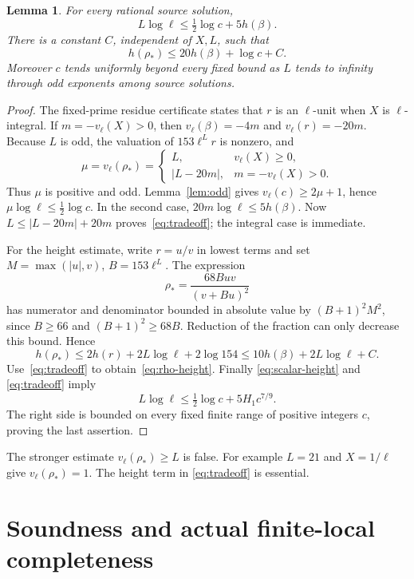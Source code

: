 \documentclass[11pt,a4paper]{article}
\newtheorem{lemma}[theorem]{Lemma}
\begin{document}
\begin{lemma}\label{lem:tradeoff}
For every rational source solution,
\begin{equation}\label{eq:tradeoff}
             L\log\ell\le\tfrac12\log c+5h(\beta).
\end{equation}
There is a constant $C$, independent of $X,L$, such that
\begin{equation}\label{eq:rho-height}
                 h(\rho_*)\le20h(\beta)+\log c+C.
\end{equation}
Moreover $c$ tends uniformly beyond every fixed bound as $L$ tends to
infinity through odd exponents among source solutions.
\end{lemma}
\begin{proof}
The fixed-prime residue certificate states that $r$ is an $\ell$-unit
when $X$ is $\ell$-integral. If $m=-v_\ell(X)>0$, then
$v_\ell(\beta)=-4m$ and $v_\ell(r)=-20m$. Because $L$ is odd,
the valuation of $153\ell^Lr$ is nonzero, and
\[
 \mu=v_\ell(\rho_*)=
 \begin{cases}
 L,&v_\ell(X)\ge0,\\
 |L-20m|,&m=-v_\ell(X)>0.
 \end{cases}
\]
Thus $\mu$ is positive and odd. Lemma~\ref{lem:odd} gives
$v_\ell(c)\ge2\mu+1$, hence $\mu\log\ell\le\frac12\log c$.
In the second case, $20m\log\ell\le5h(\beta)$. Now
$L\le|L-20m|+20m$ proves~\eqref{eq:tradeoff}; the integral case
is immediate.

For the height estimate, write $r=u/v$ in lowest terms and set
$M=\max(|u|,v)$, $B=153\ell^L$. The expression
\[
                 \rho_*=\frac{68Buv}{(v+Bu)^2}
\]
has numerator and denominator bounded in absolute value by
$(B+1)^2M^2$, since $B\ge66$ and $(B+1)^2\ge68B$.
Reduction of the fraction can only decrease this bound. Hence
\[
 h(\rho_*)\le2h(r)+2L\log\ell+2\log154
              \le10h(\beta)+2L\log\ell+C.
\]
Use~\eqref{eq:tradeoff} to obtain~\eqref{eq:rho-height}.
Finally \eqref{eq:scalar-height} and \eqref{eq:tradeoff} imply
\[
 L\log\ell\le\tfrac12\log c+5H_1c^{7/9}.
\]
The right side is bounded on every fixed finite range of positive
integers $c$, proving the last assertion.
\end{proof}

The stronger estimate $v_\ell(\rho_*)\ge L$ is false. For example
$L=21$ and $X=1/\ell$ give $v_\ell(\rho_*)=1$. The height term in
\eqref{eq:tradeoff} is essential.

\section{Soundness and actual finite-local completeness}
\end{document}
